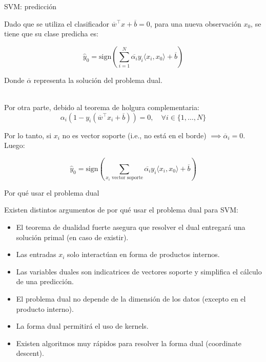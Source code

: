 \documentclass[handout, 9pt]{beamer}
\begin{document}
\begin{frame}{SVM: predicción}
	
Dado que se utiliza el clasificador $\overline{w}^\top x+\overline{b}=0$, para una nueva observación $x_0$, se tiene que su clase predicha es:

\begin{equation*}
 	\hat{y}_0 = \text{sign}\left(\sum\limits_{i=1}^{N} \overline{\alpha_i} y_i \langle x_i, x_0\rangle + \overline{b}\right)
 \end{equation*}
 
 Donde $\overline{\alpha}$ representa la solución del problema dual.\\~\
 
 Por otra parte, debido al teorema de holgura complementaria:
 \begin{equation*}
 	\alpha_i\left(1-y_i\left(\overline{w}^\top x_i+\overline{b}\right)\right)=0,\quad\forall i\in\{1,\ldots,N\}
 \end{equation*}
 
 Por lo tanto, si $x_i$ no es vector soporte (i.e., no está en el borde) $\implies\overline{\alpha}_i=0$. Luego:
 
 \begin{equation*}
 	\hat{y}_0 = \text{sign}\left(\sum\limits_{x_i\text{ vector soporte}} \overline{\alpha_i} y_i \langle x_i, x_0\rangle + \overline{b}\right)
 \end{equation*}
 
	
\end{frame}

\begin{frame}{Por qué usar el problema dual}

Existen distintos argumentos de por qué usar el problema dual para SVM:

\begin{itemize}
	\item El teorema de dualidad fuerte asegura que resolver el dual entregará una solución primal (en caso de existir).
	\item Las entradas $x_i$ solo interactúan en forma de productos internos.
	\item Las variables duales son indicatrices de vectores soporte y simplifica el cálculo de una predicción.
	\item El problema dual no depende de la dimensión de los datos (excepto en el producto interno).
	\item  La forma dual permitirá el uso de kernels.
	\item Existen algoritmos muy rápidos para resolver la forma dual (coordinate descent).
\end{itemize}
	
\end{frame}
\end{document}
